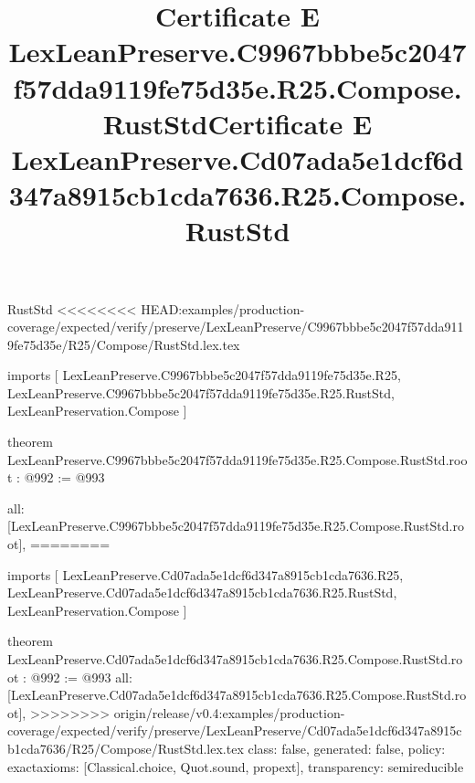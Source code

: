 \begin{lexlean}{RustStd}
<<<<<<<< HEAD:examples/production-coverage/expected/verify/preserve/LexLeanPreserve/C9967bbbe5c2047f57dda9119fe75d35e/R25/Compose/RustStd.lex.tex
\title{Certificate E LexLeanPreserve.C9967bbbe5c2047f57dda9119fe75d35e.R25.Compose.RustStd}
\begin{coremodule}
imports [
  LexLeanPreserve.C9967bbbe5c2047f57dda9119fe75d35e.R25,
  LexLeanPreserve.C9967bbbe5c2047f57dda9119fe75d35e.R25.RustStd,
  LexLeanPreservation.Compose
]

theorem LexLeanPreserve.C9967bbbe5c2047f57dda9119fe75d35e.R25.Compose.RustStd.root : @992 := @993 {
  all: [LexLeanPreserve.C9967bbbe5c2047f57dda9119fe75d35e.R25.Compose.RustStd.root],
========
\title{Certificate E LexLeanPreserve.Cd07ada5e1dcf6d347a8915cb1cda7636.R25.Compose.RustStd}
\begin{coremodule}
imports [
  LexLeanPreserve.Cd07ada5e1dcf6d347a8915cb1cda7636.R25,
  LexLeanPreserve.Cd07ada5e1dcf6d347a8915cb1cda7636.R25.RustStd,
  LexLeanPreservation.Compose
]

theorem LexLeanPreserve.Cd07ada5e1dcf6d347a8915cb1cda7636.R25.Compose.RustStd.root : @992 := @993 {
  all: [LexLeanPreserve.Cd07ada5e1dcf6d347a8915cb1cda7636.R25.Compose.RustStd.root],
>>>>>>>> origin/release/v0.4:examples/production-coverage/expected/verify/preserve/LexLeanPreserve/Cd07ada5e1dcf6d347a8915cb1cda7636/R25/Compose/RustStd.lex.tex
  class: false,
  generated: false,
  policy: exact{axioms: [Classical.choice, Quot.sound, propext]},
  transparency: semireducible
}


\end{coremodule}}
\end{coremodule}
\end{lexlean}
